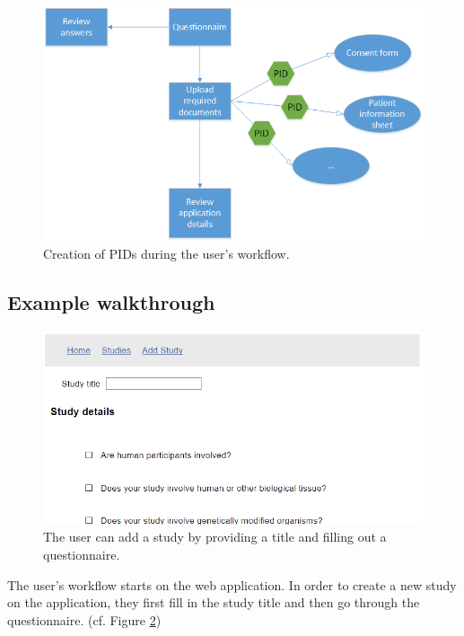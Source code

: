 \documentclass[10pt]{article}
\begin{document}
\begin{figure}
	\includegraphics[width=1\textwidth]{img/workflow_1.png}
	\caption{Creation of PIDs during the user's workflow.}
	\label{pidsimpl}
\end{figure}


\subsection{Example walkthrough}

\begin{figure}[H]
\centering
	\includegraphics[width=1\textwidth]{img/addstudy.png}
	\caption{The user can add a study by providing a title and filling out a questionnaire.}
	\label{fig:addstudy}
\end{figure}

The user's workflow starts on the web application. In order to create a new study on the application, they first fill in the study title and then go through the questionnaire. (cf. Figure \ref{fig:addstudy})\\
\end{document}
